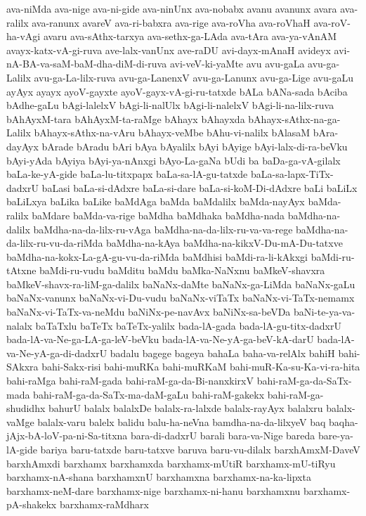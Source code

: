 {ava-niMda
ava-nige
ava-ni-gide
ava-ninUnx
ava-nobabx
avanu
avanunx
avara
ava-ralilx
ava-ranunx
avareV
ava-ri-babxra
ava-rige
ava-roVha
ava-roVhaH
ava-roV-ha-vAgi
avaru
ava-sAthx-tarxya
ava-sethx-ga-LAda
ava-tAra
ava-ya-vAnAM
avayx-katx-vA-gi-ruva
ave-lalx-vanUnx
ave-raDU
avi-dayx-mAnaH
avideyx
avi-nA-BA-va-saM-baM-dha-diM-di-ruva
avi-veV-ki-yaMte
avu
avu-gaLa
avu-ga-Lalilx
avu-ga-La-lilx-ruva
avu-ga-LanenxV
avu-ga-Lanunx
avu-ga-Lige
avu-gaLu
ayAyx
ayayx
ayoV-gayxte
ayoV-gayx-vA-gi-ru-tatxde
bALa
bANa-sada
bAciba
bAdhe-gaLu
bAgi-lalelxV
bAgi-li-nalUlx
bAgi-li-nalelxV
bAgi-li-na-lilx-ruva
bAhAyxM-tara
bAhAyxM-ta-raMge
bAhayx
bAhayxda
bAhayx-sAthx-na-ga-Lalilx
bAhayx-sAthx-na-vAru
bAhayx-veMbe
bAhu-vi-nalilx
bAlasaM
bAra-dayAyx
bArade
bAradu
bAri
bAya
bAyalilx
bAyi
bAyige
bAyi-lalx-di-ra-beVku
bAyi-yAda
bAyiya
bAyi-ya-nAnxgi
bAyo-La-gaNa
bUdi
ba
baDa-ga-vA-gilalx
baLa-ke-yA-gide
baLa-lu-titxpapx
baLa-sa-lA-gu-tatxde
baLa-sa-lapx-TiTx-dadxrU
baLasi
baLa-si-dAdxre
baLa-si-dare
baLa-si-koM-Di-dAdxre
baLi
baLiLx
baLiLxya
baLika
baLike
baMdAga
baMda
baMdalilx
baMda-nayAyx
baMda-ralilx
baMdare
baMda-va-rige
baMdha
baMdhaka
baMdha-nada
baMdha-na-dalilx
baMdha-na-da-lilx-ru-vAga
baMdha-na-da-lilx-ru-va-va-rege
baMdha-na-da-lilx-ru-vu-da-riMda
baMdha-na-kAya
baMdha-na-kikxV-Du-mA-Du-tatxve
baMdha-na-kokx-La-gA-gu-vu-da-riMda
baMdhisi
baMdi-ra-li-kAkxgi
baMdi-ru-tAtxne
baMdi-ru-vudu
baMditu
baMdu
baMka-NaNxnu
baMkeV-shavxra
baMkeV-shavx-ra-liM-ga-dalilx
baNaNx-daMte
baNaNx-ga-LiMda
baNaNx-gaLu
baNaNx-vanunx
baNaNx-vi-Du-vudu
baNaNx-viTaTx
baNaNx-vi-TaTx-nemamx
baNaNx-vi-TaTx-va-neMdu
baNiNx-pe-navAvx
baNiNx-sa-beVDa
baNi-te-ya-va-nalalx
baTaTxlu
baTeTx
baTeTx-yalilx
bada-lA-gada
bada-lA-gu-titx-dadxrU
bada-lA-va-Ne-ga-LA-ga-leV-beVku
bada-lA-va-Ne-yA-ga-beV-kA-darU
bada-lA-va-Ne-yA-ga-di-dadxrU
badalu
bagege
bageya
bahaLa
baha-va-relAlx
bahiH
bahi-SAkxra
bahi-Sakx-risi
bahi-muRKa
bahi-muRKaM
bahi-muR-Ka-su-Ka-vi-ra-hita
bahi-raMga
bahi-raM-gada
bahi-raM-ga-da-Bi-nanxkirxV
bahi-raM-ga-da-SaTx-mada
bahi-raM-ga-da-SaTx-ma-daM-gaLu
bahi-raM-gakekx
bahi-raM-ga-shudidhx
bahurU
balalx
balalxDe
balalx-ra-lalxde
balalx-rayAyx
balalxru
balalx-vaMge
balalx-varu
balelx
balidu
balu-ha-neVna
bamdha-na-da-lilxyeV
baq
baqha-jAjx-bA-loV-pa-ni-Sa-titxna
bara-di-dadxrU
barali
bara-va-Nige
bareda
bare-ya-lA-gide
bariya
baru-tatxde
baru-tatxve
baruva
baru-vu-dilalx
barxhAmxM-DaveV
barxhAmxdi
barxhamx
barxhamxda
barxhamx-mUtiR
barxhamx-mU-tiRyu
barxhamx-nA-shana
barxhamxnU
barxhamxna
barxhamx-na-ka-lipxta
barxhamx-neM-dare
barxhamx-nige
barxhamx-ni-hanu
barxhamxnu
barxhamx-pA-shakekx
barxhamx-raMdharx
}
